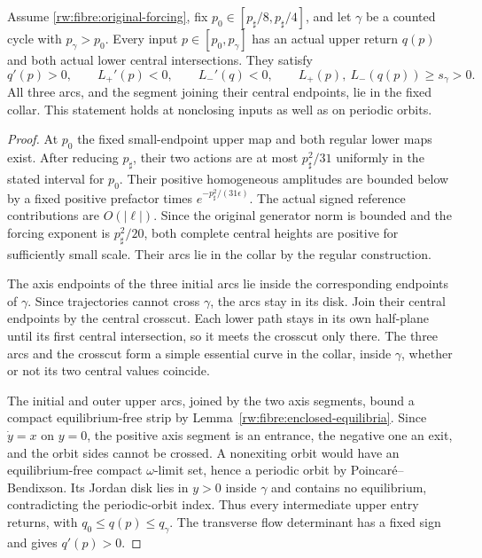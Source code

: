 \begin{proposition}
\label{rw:saturation}
Assume \eqref{rw:fibre:original-forcing}, fix
$p_0\in[p_\sharp/8,p_\sharp/4]$, and let $\gamma$ be a counted
cycle with $p_\gamma>p_0$. Every input
$p\in[p_0,p_\gamma]$ has an actual upper return $q(p)$
and both actual lower central intersections. They satisfy
\[
 q'(p)>0,\qquad L_+'(p)<0,\qquad L_-'(q)<0,
 \qquad
 L_+(p),\ L_-(q(p))\ge s_\gamma>0.
\]
All three arcs, and the segment joining their central endpoints,
lie in the fixed collar. This statement holds at nonclosing inputs
as well as on periodic orbits.
\end{proposition}
\begin{proof}
At $p_0$ the fixed small-endpoint upper map and both regular
lower maps exist. After reducing $p_\sharp$, their two actions
are at most $p_\sharp^2/31$ uniformly in the stated interval
for $p_0$. Their positive homogeneous amplitudes are bounded
below by a fixed positive prefactor times
$e^{-p_\sharp^2/(31\epsilon)}$.
The actual signed reference contributions are $O(|\ell|)$.
Since the original generator norm is bounded and the forcing
exponent is $p_\sharp^2/20$, both complete central heights are
positive for sufficiently small scale. Their arcs lie in the collar
by the regular construction.

The axis endpoints of the three initial arcs lie inside the
corresponding endpoints of $\gamma$. Since trajectories cannot cross
$\gamma$, the arcs stay in its disk. Join their central endpoints by
the central crosscut. Each lower path stays in its own half-plane until
its first central intersection, so it meets the crosscut only there.
The three arcs and the crosscut form a simple essential curve in the
collar, inside $\gamma$, whether or not its two central values coincide.

The initial and outer upper arcs, joined by the two axis segments,
bound a compact equilibrium-free strip by
Lemma~\ref{rw:fibre:enclosed-equilibria}. Since $\dot y=x$ on
$y=0$, the positive axis segment is an entrance, the negative one
an exit, and the orbit sides cannot be crossed. A nonexiting orbit
would have an equilibrium-free compact $\omega$-limit set, hence a
periodic orbit by Poincar\'e--Bendixson. Its Jordan disk lies in
$y>0$ inside $\gamma$ and contains no equilibrium, contradicting
the periodic-orbit index. Thus every intermediate upper entry returns, with
$q_0\le q(p)\le q_\gamma$. The transverse flow determinant
has a fixed sign and gives $q'(p)>0$.


\end{proof}
